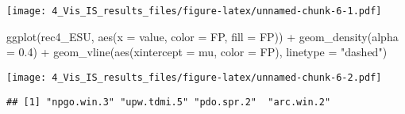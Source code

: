 \documentclass[
]{article}
\newenvironment{Shaded}{\begin{snugshade}}{\end{snugshade}}
\newcommand{\AttributeTok}[1]{\textcolor[rgb]{0.77,0.63,0.00}{#1}}
\newcommand{\CommentTok}[1]{\textcolor[rgb]{0.56,0.35,0.01}{\textit{#1}}}
\newcommand{\FloatTok}[1]{\textcolor[rgb]{0.00,0.00,0.81}{#1}}
\newcommand{\FunctionTok}[1]{\textcolor[rgb]{0.00,0.00,0.00}{#1}}
\newcommand{\NormalTok}[1]{#1}
\newcommand{\SpecialCharTok}[1]{\textcolor[rgb]{0.00,0.00,0.00}{#1}}
\newcommand{\StringTok}[1]{\textcolor[rgb]{0.31,0.60,0.02}{#1}}
\begin{document}
\texttt{[image: 4\_Vis\_IS\_results\_files/figure-latex/unnamed-chunk-6-1.pdf]}

\begin{Shaded}
\begin{Highlighting}[]
\FunctionTok{ggplot}\NormalTok{(rec4\_ESU, }\FunctionTok{aes}\NormalTok{(}\AttributeTok{x =}\NormalTok{ value, }\AttributeTok{color =}\NormalTok{ FP, }\AttributeTok{fill =}\NormalTok{ FP)) }\SpecialCharTok{+}
  \FunctionTok{geom\_density}\NormalTok{(}\AttributeTok{alpha =} \FloatTok{0.4}\NormalTok{) }\SpecialCharTok{+}
  \FunctionTok{geom\_vline}\NormalTok{(}\FunctionTok{aes}\NormalTok{(}\AttributeTok{xintercept =}\NormalTok{ mu, }\AttributeTok{color =}\NormalTok{ FP),}
             \AttributeTok{linetype =} \StringTok{"dashed"}\NormalTok{)}
\end{Highlighting}
\end{Shaded}

\texttt{[image: 4\_Vis\_IS\_results\_files/figure-latex/unnamed-chunk-6-2.pdf]}

\begin{Shaded}
\end{Shaded}

\begin{verbatim}
## [1] "npgo.win.3" "upw.tdmi.5" "pdo.spr.2"  "arc.win.2"
\end{verbatim}
\end{document}
